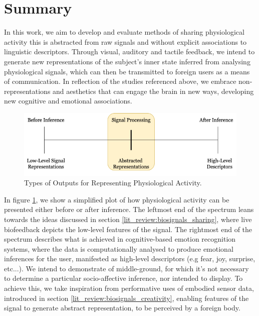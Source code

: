 \section{Summary}
\label{lit_review:conclusion}

In this work, we aim to develop and evaluate methods of sharing physiological activity this is abstracted from raw signals and without explicit associations to linguistic descriptors. Through visual, auditory and tactile feedback, we intend to generate new representations of the subject's inner state inferred from analysing physiological signals, which can then be transmitted to foreign users as a means of communication. In reflection of the studies referenced above, we embrace non-representations and aesthetics that can engage the brain in new ways, developing new cognitive and emotional associations.

\begin{figure}[htbp]
	\centering
	\includegraphics[width=1.0\textwidth]{Chapters/Figures/Abstracted_Representations.png}
	\caption{Types of Outputs for Representing Physiological Activity.}
	\label{fig:Abstracted_Representations}
\end{figure}

In figure \ref{fig:Abstracted_Representations}, we show a simplified plot of how physiological activity can be presented either before or after inference. The leftmost end of the spectrum leans towards the ideas discussed in section \ref{lit_review:biosignals_sharing}, where live biofeedback depicts the low-level features of the signal. The rightmost end of the spectrum describes what is achieved in cognitive-based emotion recognition systems, where the data is computationally analysed to produce emotional inferences for the user, manifested as high-level descriptors (e.g fear, joy, surprise, etc...). We intend to demonstrate of middle-ground, for which it's not necessary to determine a particular socio-affective inference, nor intended to display. To achieve this, we take inspiration from performative uses of embodied sensor data, introduced in section \ref{lit_review:biosignals_creativity}, enabling features of the signal to generate abstract representation, to be perceived by a foreign body.

